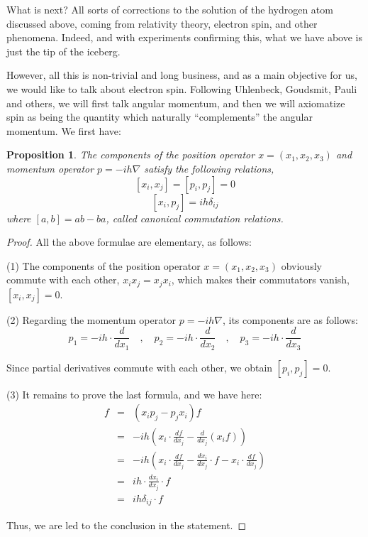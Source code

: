 \documentclass[12pt]{amsbook}
\newtheorem{proposition}[theorem]{Proposition}
\begin{document}
What is next? All sorts of corrections to the solution of the hydrogen atom discussed above, coming from relativity theory, electron spin, and other phenomena. Indeed, and with experiments confirming this, what we have above is just the tip of the iceberg.

\bigskip

However, all this is non-trivial and long business, and as a main objective for us, we would like to talk about electron spin. Following Uhlenbeck, Goudsmit, Pauli and others, we will first talk angular momentum, and then we will axiomatize spin as being the quantity which naturally ``complements'' the angular momentum. We first have:

\begin{proposition}
The components of the position operator $x=(x_1,x_2,x_3)$ and momentum operator $p=-ih\nabla$ satisfy the following relations,
$$[x_i,x_j]=[p_i,p_j]=0$$
$$[x_i,p_j]=ih\delta_{ij}$$
where $[a,b]=ab-ba$, called canonical commutation relations.
\end{proposition}

\begin{proof}
All the above formulae are elementary, as follows:

\medskip

(1) The components of the position operator $x=(x_1,x_2,x_3)$ obviously commute with each other, $x_ix_j=x_jx_i$, which makes their commutators vanish, $[x_i,x_j]=0$. 

\medskip

(2) Regarding the momentum operator $p=-ih\nabla$, its components are as follows:
$$p_1=-ih\cdot\frac{d}{dx_1}\quad,\quad 
p_2=-ih\cdot\frac{d}{dx_2}\quad,\quad
p_3=-ih\cdot\frac{d}{dx_3}$$

Since partial derivatives commute with each other, we obtain $[p_i,p_j]=0$.

\medskip

(3) It remains to prove the last formula, and we have here:
\begin{eqnarray*}
[x_i,p_j]f
&=&(x_ip_j-p_jx_i)f\\
&=&-ih\left(x_i\cdot\frac{df}{dx_j}-\frac{d}{dx_j}(x_if)\right)\\
&=&-ih\left(x_i\cdot\frac{df}{dx_j}-\frac{dx_i}{dx_j}\cdot f-
x_i\cdot\frac{df}{dx_j}\right)\\
&=&ih\cdot\frac{dx_i}{dx_j}\cdot f\\
&=&ih\delta_{ij}\cdot f
\end{eqnarray*}

Thus, we are led to the conclusion in the statement.
\end{proof}
\end{document}
